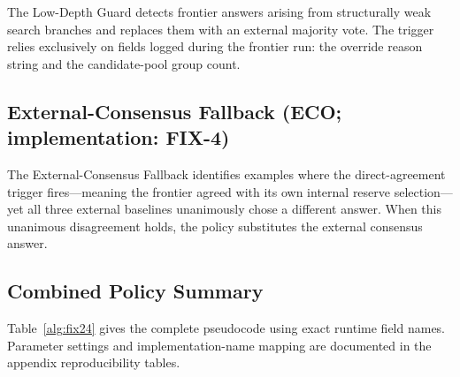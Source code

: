 The Low-Depth Guard detects frontier answers arising from structurally weak search branches and replaces them with an external majority vote.  The trigger relies exclusively on fields logged during the frontier run: the override reason string and the candidate-pool group count.

\subsection{External-Consensus Fallback (ECO; implementation: FIX-4)}
\label{sec:fix4}

The External-Consensus Fallback identifies examples where the direct-agreement trigger fires---meaning the frontier agreed with its own internal reserve selection---yet all three external baselines unanimously chose a different answer.  When this unanimous disagreement holds, the policy substitutes the external consensus answer.

\subsection{Combined Policy Summary}
\label{sec:fix24_algorithm}

Table~\ref{alg:fix24} gives the complete pseudocode using exact runtime field names. Parameter settings and implementation-name mapping are documented in the appendix reproducibility tables.

